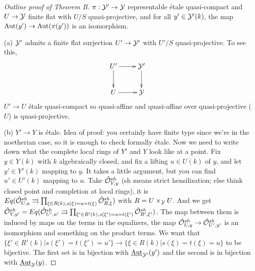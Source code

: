 \begin{proof}[Outline proof of Theorem B]
  $\pi:\mathcal{Y}'\to \mathcal{Y}$ representable \'etale quasi-compact and $U\to \mathcal{Y}$
finite flat with $U/S$ quasi-projective, and for all $y'\in \mathcal{Y}'(k)$,
the map $\operatorname{Aut}(y')\to \operatorname{Aut}(\pi(y'))$ is an isomorphism.

  (a) $\mathcal{Y}'$ admits a finite flat surjection $U'\to \mathcal{Y}'$ with $U'/S$
quasi-projective. To see this,
  \[\xymatrix{
   U'\ar[r]\ar[d] & \Y'\ar[d]\\ U\ar[r] & \Y
  }\]
  $U'\to U$ \'etale quasi-compact so quasi-affine and quasi-affine
over quasi-projective ($U$) is quasi-projective. \anton{}

  (b) $Y'\to Y$ is \'etale. Idea of proof: you certainly have finite
type since we're in the noetherian case, so it is enough to check
formally \'etale. Now we need to write down what the complete local
rings of $Y'$ and $Y$ look like at a point. Fix $y\in Y(k)$ with $k$
algebraically closed, and fix a lifting $u\in U(k)$ of $y$, and let
$y'\in Y'(k)$ mapping to $y$. It takes a little argument, but you can
find $u'\in U'(k)$ mapping to $u$. Take $\hat {\mathcal{O}}_{Y,y}^{sh}$ (sh
means strict hensilization; else think closed point and completion at
local rings), it is $Eq(\hat {\mathcal{O}}^{sh}_{U,u}\rightrightarrows
\prod_{\xi\in R(k), s(\xi)=u=t(\xi)} \hat {\mathcal{O}}^{sh}_{R,\xi})$ with
$R=U\times_{\mathcal{Y}} U$. And we get $\hat {\mathcal{O}}_{Y,y'}^{sh} = Eq(\hat
{\mathcal{O}}^{sh}_{U',u'}\rightrightarrows \prod_{\xi'\in R'(k),
s(\xi')=u=t(\xi')} \hat {\mathcal{O}}^{sh}_{R',\xi'})$. The map between them is
induced by maps on the terms in the equalizers, the map $\hat
{\mathcal{O}}^{sh}_{U,y}\to \hat {\mathcal{O}}^{sh}_{U',y'}$ is an isomorphism and
something on the product terms. We want that $\{\xi'\in
R'(k)|s(\xi')=t(\xi')=u'\}\to \{\xi\in R(k)|s(\xi)=t(\xi)=u\}$ to be
bijective. The first set is in bijection with $\operatorname{\underline{Aut}}_{\mathcal{Y}'}(y')$ and
the second is in bijection with $\operatorname{\underline{Aut}}_{\mathcal{Y}}(y)$.
\end{proof}


